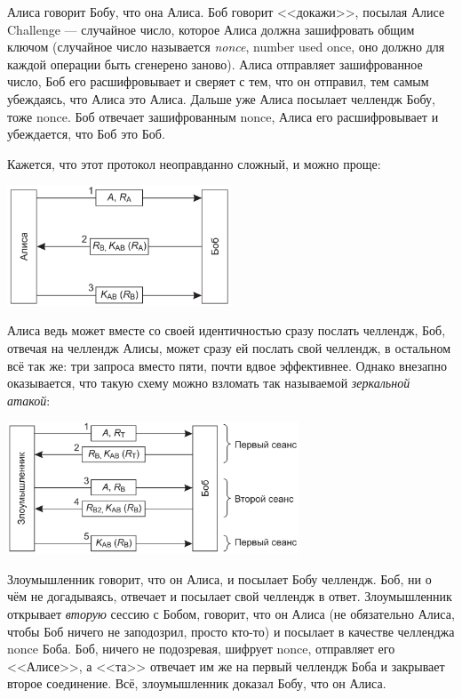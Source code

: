 \documentclass{../mcstext}
\begin{document}
Алиса говорит Бобу, что она Алиса. Боб говорит <<докажи>>, посылая Алисе Challenge --- случайное число, которое Алиса должна зашифровать общим ключом (случайное число называется \emph{nonce}, number used once, оно должно для каждой операции быть сгенерено заново). Алиса отправляет зашифрованное число, Боб его расшифровывает и сверяет с тем, что он отправил, тем самым убеждаясь, что Алиса это Алиса. Дальше уже Алиса посылает челлендж Бобу, тоже nonce. Боб отвечает зашифрованным nonce, Алиса его расшифровывает и убеждается, что Боб это Боб.

Кажется, что этот протокол неоправданно сложный, и можно проще:

\begin{center}
    \includegraphics[width=0.5\textwidth]{simpleChallengeResponse.png}
\end{center}

Алиса ведь может вместе со своей идентичностью сразу послать челлендж, Боб, отвечая на челлендж Алисы, может сразу ей послать свой челлендж, в остальном всё так же: три запроса вместо пяти, почти вдвое эффективнее. Однако внезапно оказывается, что такую схему можно взломать так называемой \emph{зеркальной атакой}: 

\begin{center}
    \includegraphics[width=0.65\textwidth]{mirrorAttack.png}
\end{center}

Злоумышленник говорит, что он Алиса, и посылает Бобу челлендж. Боб, ни о чём не догадываясь, отвечает и посылает свой челлендж в ответ. Злоумышленник открывает \emph{вторую} сессию с Бобом, говорит, что он Алиса (не обязательно Алиса, чтобы Боб ничего не заподозрил, просто кто-то) и посылает в качестве челленджа nonce Боба. Боб, ничего не подозревая, шифрует nonce, отправляет его <<Алисе>>, а <<та>> отвечает им же на первый челлендж Боба и закрывает второе соединение. Всё, злоумышленник доказал Бобу, что он Алиса.
\end{document}
